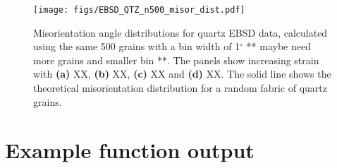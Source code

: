 \documentclass[a4paper,12pt,twoside]{report}
\numberwithin{equation}{chapter}
\begin{document}
\begin{figure}[h]
  \centering
    \texttt{[image: figs/EBSD\_QTZ\_n500\_misor\_dist.pdf]}
  \caption[Misorientation angle distribution (quartz EBSD)]{Misorientation angle distributions for quartz EBSD data, calculated using the same 500 grains with a bin width of 1$^{\circ}$ ** maybe need more grains and smaller bin **. The panels show increasing strain with \textbf{(a)} XX, \textbf{(b)} XX, \textbf{(c)} XX and \textbf{(d)} XX. The solid line shows the theoretical misorientation distribution for a random fabric of quartz grains. } 
  \label{fig:APP_misor_dist_qtz_ebsd}
\end{figure} 

\newpage
\section{Example function output} \label{App:example_output}
\end{document}
